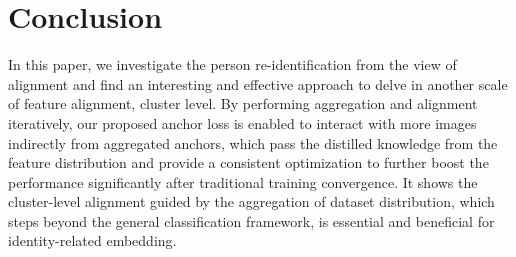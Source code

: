 \documentclass[runningheads]{llncs}
\begin{document}
\section{Conclusion}

In this paper, we investigate the person re-identification from the view of alignment and find an interesting and effective approach to delve in another scale of feature alignment, cluster level.
By performing aggregation and alignment iteratively, our proposed anchor loss is enabled to interact with more images indirectly from aggregated anchors, which pass the distilled knowledge from the feature distribution and provide a consistent optimization to further boost the performance significantly after traditional training convergence.
It shows the cluster-level alignment guided by the aggregation of dataset distribution, which steps beyond the general classification framework, is essential and beneficial for identity-related embedding.

\clearpage


\end{document}
